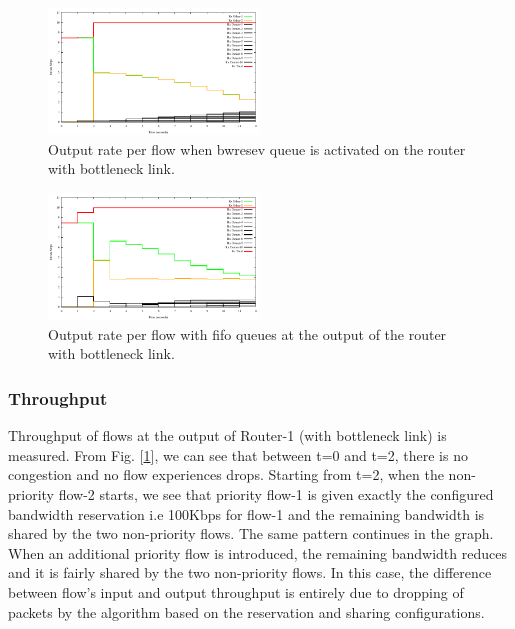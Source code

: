 \documentclass[conference]{IEEEtran}
\begin{document}
\begin{figure}[ht]
	\begin{center}
		\includegraphics[width=0.50\textwidth]{plots/rx_detnet.pdf}
		\caption{Output rate per flow when bwresev queue is activated on the router with bottleneck link.}\label{fig:rx_detnet}
	\end{center}
\end{figure}
\begin{figure}[ht]
	\begin{center}
		\includegraphics[width=0.50\textwidth]{plots/rx_fifo.pdf}
		\caption{Output rate per flow with fifo queues at the output of the router with bottleneck link.}\label{fig:rx_fifo}
	\end{center}
\end{figure}

\subsubsection{Throughput}
Throughput of flows at the output of Router-1 (with bottleneck link) is measured. From Fig. [\ref{fig:rx_detnet}], we can see that between t=0 and t=2, there is no congestion and no flow experiences drops. Starting from t=2, when the non-priority flow-2 starts, we see that priority flow-1 is given exactly the configured bandwidth reservation i.e 100Kbps for flow-1 and the remaining bandwidth is shared by the two non-priority flows. The same pattern continues in the graph. When an additional priority flow is introduced, the remaining bandwidth reduces and it is fairly shared by the two non-priority flows. In this case, the difference between flow's input and output throughput is entirely due to dropping of packets by the algorithm based on the reservation and sharing configurations. 
\end{document}
